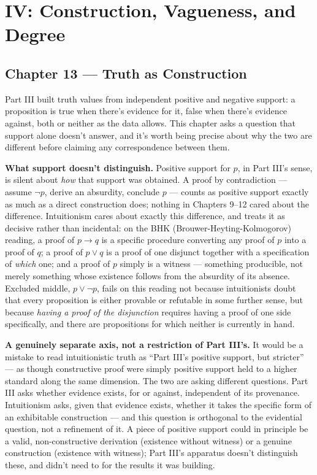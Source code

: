 \part{IV: Construction, Vagueness, and Degree}\label{part-iv-construction-vagueness-and-degree}

\hypertarget{chapter-13-truth-as-construction}{%
\chapter*{Chapter 13 --- Truth as Construction}
\label{chapter-13-truth-as-construction}}

Part III built truth values from independent positive and negative
support: a proposition is true when there's evidence for it, false when
there's evidence against, both or neither as the data allows. This
chapter asks a question that support alone doesn't answer, and it's
worth being precise about why the two are different before claiming any
correspondence between them.

\textbf{What support doesn't distinguish.} Positive support for \(p\), in
Part III's sense, is silent about \emph{how} that support was obtained. A
proof by contradiction --- assume \(\neg p\), derive an absurdity, conclude
\(p\) --- counts as positive support exactly as much as a direct construction
does; nothing in Chapters 9--12 cared about the difference. Intuitionism
cares about exactly this difference, and treats it as decisive rather
than incidental: on the BHK (Brouwer-Heyting-Kolmogorov)~\cite{heyting1956} reading, a proof
of \(p \to q\) is a specific procedure converting any proof of \(p\) into a
proof of \(q\); a proof of \(p \vee q\) is a proof of one disjunct together
with a specification of \emph{which} one; and a proof of \(p\) simply is a
witness --- something producible, not merely something whose existence
follows from the absurdity of its absence. Excluded middle, \(p \vee \neg p\), fails on this reading not because intuitionists doubt that every
proposition is either provable or refutable in some further sense, but
because \emph{having a proof of the disjunction} requires having a proof of
one side specifically, and there are propositions for which neither is
currently in hand.

\textbf{A genuinely separate axis, not a restriction of Part III's.} It would
be a mistake to read intuitionistic truth as ``Part III's positive support,
but stricter'' --- as though constructive proof were simply positive support
held to a higher standard along the same dimension. The two are asking
different questions. Part III asks whether evidence exists, for or
against, independent of its provenance. Intuitionism asks, given that
evidence exists, whether it takes the specific form of an exhibitable
construction --- and this question is orthogonal to the evidential
question, not a refinement of it. A piece of positive support could in
principle be a valid, non-constructive derivation (existence without
witness) or a genuine construction (existence with witness); Part III's
apparatus doesn't distinguish these, and didn't need to for the results
it was building.


